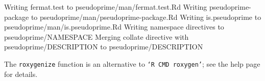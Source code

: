 \documentclass{article}
\begin{document}
\begin{Schunk}
\begin{Soutput}
Writing fermat.test to pseudoprime/man/fermat.test.Rd
Writing pseudoprime-package to pseudoprime/man/pseudoprime-package.Rd
Writing is.pseudoprime to pseudoprime/man/is.pseudoprime.Rd
Writing namespace directives to pseudoprime/NAMESPACE 
Merging collate directive with pseudoprime/DESCRIPTION to pseudoprime/DESCRIPTION 
\end{Soutput}
\end{Schunk}

The \texttt{roxygenize} function is an alternative to \texttt{`R CMD
  roxygen'}; see the help page for details.




\end{document}
